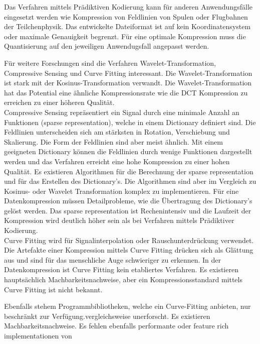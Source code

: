 Das Verfahren mittels Prädiktiven Kodierung kann für anderen Anwendungsfälle eingesetzt werden wie Kompression von Feldlinien von Spulen oder Flugbahnen der Teilchenphysik. Das entwickelte Dateiformat ist auf kein Koordinatensystem oder maximale Genauigkeit begrenzt. Für eine optimale Kompression muss die Quantisierung auf den jeweiligen Anwendugsfall angepasst werden.

Für weitere Forschungen sind die Verfahren Wavelet-Transformation, Compressive Sensing und Curve Fitting interessant. Die Wavelet-Transformation ist stark mit der Kosinus-Transformation verwandt. Die Wavelet-Transformation hat das Potential eine ähnliche Kompressionsrate wie die DCT Kompression zu erreichen zu einer höheren Qualität.\\
Compressive Sensing repräsentiert ein Signal durch eine minimale Anzahl an Funktionen (sparse representation), welche in einem Dictionary definiert sind. Die Feldlinien unterscheiden sich am stärksten in Rotation, Verschiebung und Skalierung. Die Form der Feldlinien sind aber meist ähnlich. Mit einem geeigneten Dictionary können die Feldlinien durch wenige Funktionen dargestellt werden und das Verfahren erreicht eine hohe Kompression zu einer hohen Qualität. Es existieren Algorithmen für die Berechnung der sparse representation und für das Erstellen des Dictionary's. Die Algorithmen sind aber im Vergleich zu Kosinus- oder Wavelet Transformation komplex zu implementieren. Für eine Datenkompression müssen Detailprobleme, wie die Übertragung des Dictionary's gelöst werden. Das sparse representation ist Rechenintensiv und die Laufzeit der Kompression wird deutlich höher sein als bei Verfahren mittels Prädiktiver Kodierung.\\
Curve Fitting wird für Signalinterpolation oder Rauschunterdrückung verwendet. Die Artefakte einer Kompression mittels Curve Fitting drücken sich als Glättung aus und sind für das menschliche Auge schwieriger zu erkennen. In der Datenkompression ist Curve Fitting kein etabliertes Verfahren. Es existieren hauptsächlich Machbarkeitsnachweise, aber ein Kompressionsstandard mittels Curve Fitting ist nicht bekannt.

Ebenfalls stehem Programmbibliotheken, welche ein Curve-Fitting anbieten, nur beschränkt zur Verfügung.vergleichsweise unerforscht. Es existieren Machbarkeitsnachweise. Es fehlen ebenfalls performante oder feature rich implementationen von 
